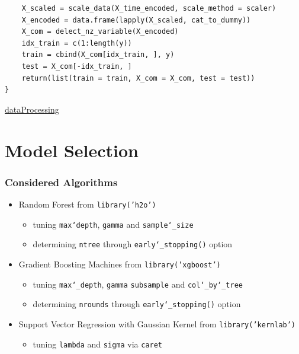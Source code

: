\documentclass{beamer}
\begin{document}
\begin{frame}[fragile]
\begin{center}
\begin{lstlisting}
 	X_scaled = scale_data(X_time_encoded, scale_method = scaler)
    X_encoded = data.frame(lapply(X_scaled, cat_to_dummy))
    X_com = delect_nz_variable(X_encoded)
    idx_train = c(1:length(y))
    train = cbind(X_com[idx_train, ], y)
    test = X_com[-idx_train, ]
    return(list(train = train, X_com = X_com, test = test))
}
\end{lstlisting}
\end{center}
\quantnet \href{https://github.com/koehnden/SPL16/tree/master/Quantnet/dataProcessing/}{dataProcessing}
\end{frame}

 

\section{Model Selection}

\begin{frame}
\frametitle{Considered Algorithms}
\begin{itemize}
\item Random Forest from \texttt{library('h2o')}
\begin{itemize}
\item tuning \texttt{max\char`depth},  \texttt{gamma} and \texttt{sample\char`_size}
\item determining \texttt{ntree} through \texttt{early\char`_stopping()} option
\end{itemize}
\item Gradient Boosting Machines from \texttt{library('xgboost')}
\begin{itemize}
\item tuning  \texttt{max\char`_depth}, \texttt{gamma} \texttt{subsample} and \texttt{col\char`_by\char`_tree}
\item determining \texttt{nrounds} through \texttt{early\char`_stopping()} option
\end{itemize}
\item Support Vector Regression with Gaussian Kernel from \texttt{library('kernlab')} 
\begin{itemize}
\item tuning \texttt{lambda} and \texttt{sigma} via \texttt{caret} 
\end{itemize}
\end{itemize}	
\end{frame}
\end{document}
